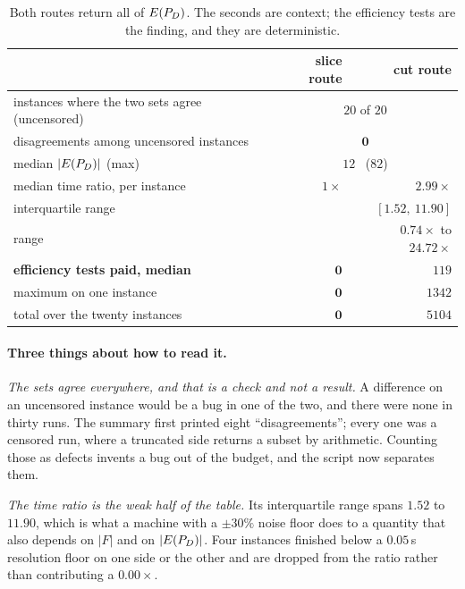 \documentclass[11pt,a4paper]{article}
\begin{document}
\begin{table}[h]
\centering
\caption{Both routes return all of $E(P_{D})$.  The seconds are context; the
efficiency tests are the finding, and they are deterministic.}
\begin{tabular}{lrr}
\toprule
 & slice route & cut route \\
\midrule
instances where the two sets agree (uncensored) & \multicolumn{2}{c}{$20$ of $20$} \\
disagreements among uncensored instances        & \multicolumn{2}{c}{$\mathbf{0}$} \\
\midrule
median $|E(P_{D})|$ (max)                             & \multicolumn{2}{c}{$12$ \ ($82$)} \\
median time ratio, per instance                 & $1\times$ & $\mathbf{2.99\times}$ \\
\quad interquartile range                       &  & $[1.52,\ 11.90]$ \\
\quad range                                     &  & $0.74\times$ to $24.72\times$ \\
\midrule
\textbf{efficiency tests paid, median}          & $\mathbf{0}$ & $119$ \\
\quad maximum on one instance                   & $\mathbf{0}$ & $1342$ \\
\quad total over the twenty instances           & $\mathbf{0}$ & $5104$ \\
\bottomrule
\end{tabular}
\end{table}

\paragraph{Three things about how to read it.}

\emph{The sets agree everywhere, and that is a check and not a result.}  A
difference on an uncensored instance would be a bug in one of the two, and
there were none in thirty runs.  The summary first printed eight
``disagreements''; every one was a censored run, where a truncated side
returns a subset by arithmetic.  Counting those as defects invents a bug out of
the budget, and the script now separates them.

\emph{The time ratio is the weak half of the table.}  Its interquartile range
spans $1.52$ to $11.90$, which is what a machine with a $\pm 30\%$ noise floor
does to a quantity that also depends on $|F|$ and on $|E(P_{D})|$.  Four instances
finished below a $0.05$\,s resolution floor on one side or the other and are
dropped from the ratio rather than contributing a $0.00\times$.
\end{document}
